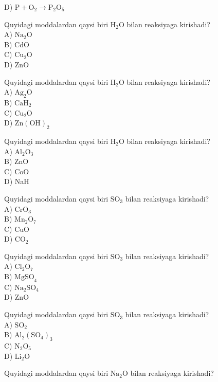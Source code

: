 D) $\mathrm{P}+\mathrm{O}_{2} \rightarrow \mathrm{P}_{2} \mathrm{O}_{5}$
  \item Quyidagi moddalardan qaysi biri $\mathrm{H}_{2} \mathrm{O}$ bilan reaksiyaga kirishadi?\\
A) $\mathrm{Na}_{2} \mathrm{O}$\\
B) CdO\\
C) $\mathrm{Cu}_{2} \mathrm{O}$\\
D) ZnO
  \item Quyidagi moddalardan qaysi biri $\mathrm{H}_{2} \mathrm{O}$ bilan reaksiyaga kirishadi?\\
A) $\mathrm{Ag}_{2} \mathrm{O}$\\
B) $\mathrm{CaH}_{2}$\\
C) $\mathrm{Cu}_{2} \mathrm{O}$\\
D) $\mathrm{Zn}(\mathrm{OH})_{2}$
  \item Quyidagi moddalardan qaysi biri $\mathrm{H}_{2} \mathrm{O}$ bilan reaksiyaga kirishadi?\\
A) $\mathrm{Al}_{2} \mathrm{O}_{3}$\\
B) ZnO\\
C) CoO\\
D) NaH
  \item Quyidagi moddalardan qaysi biri $\mathrm{SO}_{3}$ bilan reaksiyaga kirishadi?\\
A) $\mathrm{CrO}_{3}$\\
B) $\mathrm{Mn}_{2} \mathrm{O}_{7}$\\
C) CuO\\
D) $\mathrm{CO}_{2}$
  \item Quyidagi moddalardan qaysi biri $\mathrm{SO}_{3}$ bilan reaksiyaga kirishadi?\\
A) $\mathrm{Cl}_{2} \mathrm{O}_{7}$\\
B) $\mathrm{MgSO}_{4}$\\
C) $\mathrm{Na}_{2} \mathrm{SO}_{4}$\\
D) ZnO
  \item Quyidagi moddalardan qaysi biri $\mathrm{SO}_{3}$ bilan reaksiyaga kirishadi?\\
A) $\mathrm{SO}_{2}$\\
B) $\mathrm{Al}_{2}\left(\mathrm{SO}_{4}\right)_{3}$\\
C) $\mathrm{N}_{2} \mathrm{O}_{5}$\\
D) $\mathrm{Li}_{2} \mathrm{O}$
  \item Quyidagi moddalardan qaysi biri $\mathrm{Na}_{2} \mathrm{O}$ bilan reaksiyaga kirishadi?\\
